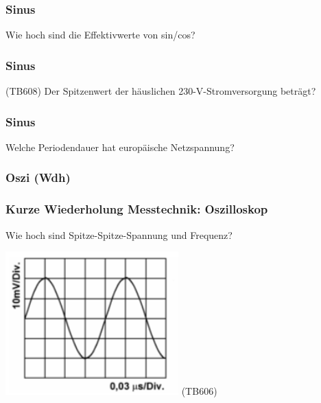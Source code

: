 \begin{frame}
    \frametitle{Sinus}

    \begin{block}{Wie hoch sind die Effektivwerte von sin/cos?}
    \end{block}

\end{frame}

\begin{frame}
    \frametitle{Sinus}

    \begin{block}{(TB608) Der Spitzenwert der häuslichen 230-V-Stromversorgung beträgt?}
    \end{block}


\end{frame}

\begin{frame}
    \frametitle{Sinus}

    \begin{block}{Welche Periodendauer hat europäische Netzspannung?}
    \end{block}

\end{frame}

\subsubsection{Oszi (Wdh)}
 
\begin{frame}
    \frametitle{Kurze Wiederholung Messtechnik: Oszilloskop}


    \begin{block}{
        Wie hoch sind Spitze-Spitze-Spannung und Frequenz?
        \begin{center}
            \includegraphics[width=0.5\textwidth]{a11/TB605.png}
            \tiny (TB606)
        \end{center}
    }
    \end{block}

\end{frame}
   
